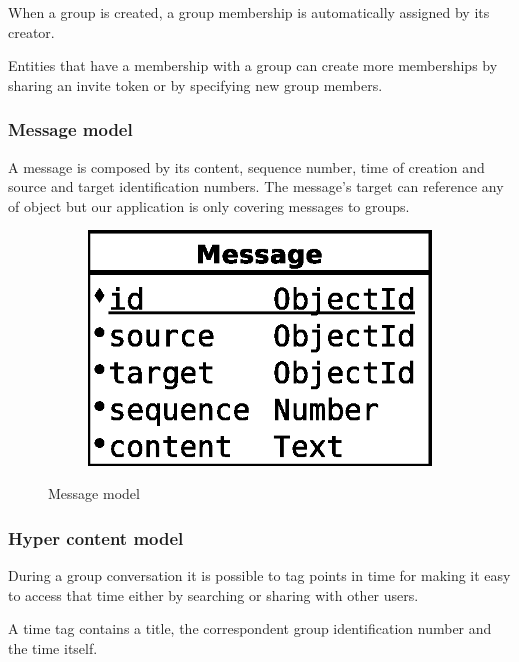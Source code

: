 When a group is created, a group membership is automatically assigned by its creator.

Entities that have a membership with a group can create more memberships by sharing an invite token or by specifying new group members.

\subsubsection{Message model}

A message is composed by its content, sequence number, time of creation and source and target identification numbers. The message's target can reference any of object but our application is only covering messages to groups.

\begin{figure}[H]
    \centering
    \begin{subfigure}[b]{0.30\textwidth}
    	\includegraphics[width=\textwidth]{figures/model_message}
    \end{subfigure}
    \caption{Message model}
\end{figure} 

\subsubsection{Hyper content model}

During a group conversation it is possible to tag points in time for making it easy to access that time either by searching or sharing with other users.

A time tag contains a title, the correspondent group identification number and the time itself.

